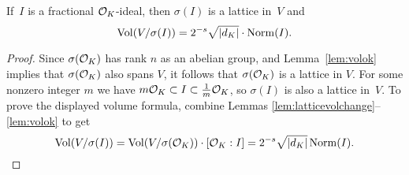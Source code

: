 \begin{lemma}\label{lem:volfracideal}
If~$I$ is a  fractional $\mathcal{O}_K$-ideal, then $\sigma(I)$ is
a lattice in~$V$ and 
\[
\operatorname{Vol}(V/\sigma(I)) = 2^{-s}\sqrt{|d_K|}\cdot \operatorname{Norm}(I).
\]
\end{lemma}
\begin{proof}
Since $\sigma(\mathcal{O}_K)$ has rank $n$ as an abelian group, and 
Lemma~\ref{lem:volok} implies that $\sigma(\mathcal{O}_K)$ also spans $V$,
it follows that $\sigma(\mathcal{O}_K)$ is a lattice in $V$.
For some nonzero integer $m$ we have
$m\mathcal{O}_K \subset I \subset \frac{1}{m}\mathcal{O}_K$,
so $\sigma(I)$ is also a lattice in~$V$.  
To prove the displayed volume
formula, combine Lemmas
\ref{lem:latticevolchange}--\ref{lem:volok} to get
\[
\operatorname{Vol}(V/\sigma(I)) = \operatorname{Vol}(V/\sigma(\mathcal{O}_K))\cdot[\mathcal{O}_K:I]
         =2^{-s}\sqrt{|d_K|}\operatorname{Norm}(I).
\]
\end{proof}


